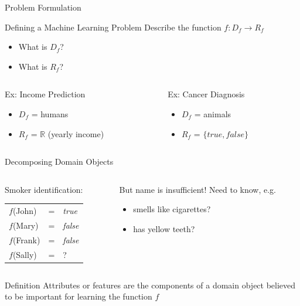 \documentclass[14pt]{beamer}
\begin{document}
\begin{frame}{Problem Formulation}
\begin{block}{Defining a Machine Learning Problem}
Describe the function $f\!: D_f \rightarrow R_f$
\begin{itemize}
\item What is $D_f$?
\item What is $R_f$?
\end{itemize}
\end{block}
\pause
\begin{columns}
\begin{column}{2in}
\begin{block}{Ex: Income Prediction}
\begin{itemize}
\pause
\item $D_f$ = \pause humans
\pause
\item $R_f$ = \pause $\mathbb{R}$ (yearly income)
\end{itemize}
\end{block}
\end{column}
\pause
\begin{column}{2in}
\begin{block}{Ex: Cancer Diagnosis}
\begin{itemize}
\pause
\item $D_f$ = \pause animals
\pause
\item $R_f$ = \pause $\{\textit{true},\textit{false}\}$
\end{itemize}
\end{block}
\end{column}
\end{columns}
\end{frame}

\begin{frame}{Decomposing Domain Objects}
\begin{columns}
\begin{column}{1.6in}
Smoker identification: \\
\smallskip
\begin{tabular}{lll}
$f$(John)  & = & \textit{true} \\
$f$(Mary)  & = & \textit{false} \\
$f$(Frank) & = & \textit{false} \\
$f$(Sally) & = & ?
\end{tabular}
\end{column}
\pause
\begin{column}{2.6in}
\begin{block}{But name is insufficient!}
Need to know, e.g.
\begin{itemize}
\item smells like cigarettes?
\item has yellow teeth?
\end{itemize}
\end{block}
\end{column}
\end{columns}
\bigskip
\pause
\begin{block}{Definition}
\alert{Attributes} or \alert{features} are the components of a domain object believed to be important for learning the function $f$
\end{block}
\end{frame}
\end{document}
